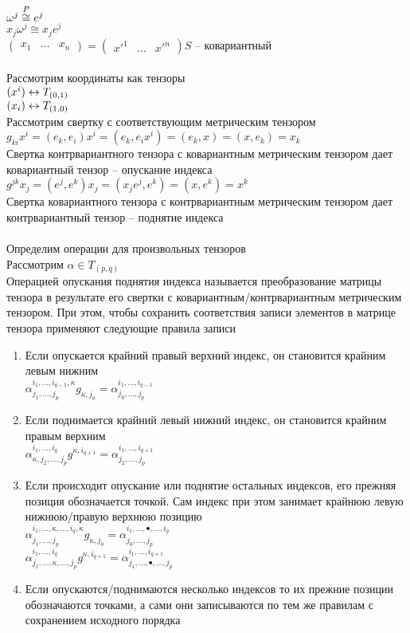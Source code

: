 \documentclass[12pt]{article}
\begin{document}
$\omega^j \overset P \cong e^j$\\
$x_j \omega^j \cong x_j  e^j$\\
$\begin{pmatrix}x_1 & \ldots & x_n\end{pmatrix} = \begin{pmatrix}x'^1 & \ldots &x'^n\end{pmatrix}S$ -- ковариантный\\\\
Рассмотрим координаты как тензоры\\
$(x^i) \leftrightarrow T_{(0,1)}$\\
$(x_i) \leftrightarrow T_{(1,0)}$\\
Рассмотрим свертку с соответствующим метрическим тензором\\
$g_{ki} x^i =(e_k, e_i) x^i = (e_k, e_ix^i) = (e_k, x) = (x, e_k) = x_k$\\
Свертка контрвариантного тензора с ковариантным метрическим тензором дает ковариантный тензор -- опускание индекса\\
$g^{jk} x_j = (e^j, e^k) x_j = (x_j e^j, e^k) = (x, e^k) = x^k$\\
Свертка ковариантного тензора с контрвариантным метрическим тензором дает контрвариантный тензор -- поднятие индекса\\\\
Определим операции для произвольных тензоров\\
Рассмотрим $\alpha\in T_{(p,q)}$\\
Операцией опускания поднятия индекса называется преобразование матрицы тензора в результате его свертки с ковариантным/контрвариантным метрическим тензором. При этом, чтобы сохранить соответствия записи элементов в матрице тензора применяют следующие правила записи
\begin{enumerate}
    \item Если опускается крайний правый верхний индекс, он становится крайним левым нижним\\
    $\alpha^{i_1, \ldots, i_{q-1}, \kappa}_{j_1, \ldots, j_p} g_{\kappa,j_0} = \alpha^{i_1, \ldots, i_{q-1}}_{j_0, \ldots, j_p}$
    \item Если поднимается крайний левый нижний индекс, он становится крайним правым верхним\\
    $\alpha^{i_1, \ldots, i_q}_{\kappa, j_2, \ldots, j_p} g^{\kappa,i_{q+1}} = \alpha^{i_1, \ldots, i_{q+1}}_{j_2, \ldots, j_p}$
    \item Если происходит опускание или поднятие остальных индексов, его прежняя позиция обозначается точкой. Сам индекс при этом занимает крайнюю левую нижнюю/правую верхнюю позицию\\
    $\alpha^{i_1, \ldots, \kappa, \ldots, i_q, \kappa}_{j_1, \ldots, j_p} g_{\kappa,j_0} = \alpha^{i_1, \ldots, \bullet, \ldots, i_q}_{j_0, \ldots, j_p}$\\
    $\alpha^{i_1, \ldots, i_q}_{j_1, \ldots, \kappa, \ldots, j_p} g^{\kappa,i_{q+1}} = \alpha^{i_1, \ldots, i_{q+1}}_{j_1, \ldots, \bullet, \ldots, j_p}$
    \item Если опускаются/поднимаются несколько индексов то их прежние позиции обозначаются точками, а сами они записываются по тем же правилам с сохранением исходного порядка
\end{enumerate}
\end{document}
